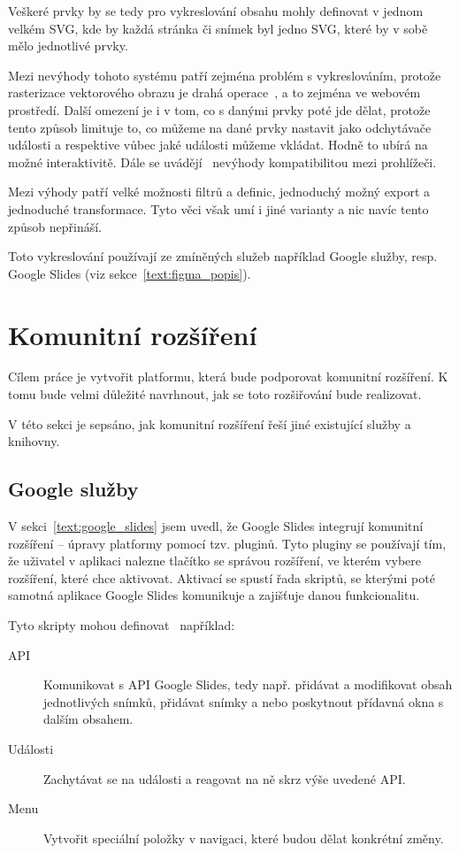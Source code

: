 Veškeré prvky by se tedy pro vykreslování obsahu mohly definovat v jednom velkém SVG, kde by každá stránka či snímek byl jedno SVG, které by v sobě mělo jednotlivé prvky.

Mezi nevýhody tohoto systému patří zejména problém s vykreslováním, protože rasterizace vektorového obrazu je drahá operace~\cite{svg_css_html}, a to zejména ve webovém prostředí.
Další omezení je i v tom, co s danými prvky poté jde dělat, protože tento způsob limituje to, co můžeme na dané prvky nastavit jako odchytávače události a respektive vůbec jaké události můžeme vkládat.
Hodně to ubírá na možné interaktivitě.
Dále se uvádějí~\cite{svg_css_html} nevýhody kompatibilitou mezi prohlížeči.

Mezi výhody patří velké možnosti filtrů a definic, jednoduchý možný export a jednoduché transformace.
Tyto věci však umí i jiné varianty a nic navíc tento způsob nepřináší.

Toto vykreslování používají ze zmíněných služeb například Google služby, resp. Google Slides (viz sekce~\ref{text:figma_popis}).

\section{Komunitní rozšíření}\label{text:community_plugins}

Cílem práce je vytvořit platformu, která bude podporovat komunitní rozšíření.
K tomu bude velmi důležité navrhnout, jak se toto rozšiřování bude realizovat.

V této sekci je sepsáno, jak komunitní rozšíření řeší jiné existující služby a knihovny.

\subsection{Google služby}

V sekci~\ref{text:google_slides} jsem uvedl, že Google Slides integrují komunitní rozšíření -- úpravy platformy pomocí tzv. pluginů.
Tyto pluginy se používají tím, že uživatel v aplikaci nalezne tlačítko se správou rozšíření, ve kterém vybere rozšíření, které chce aktivovat.
Aktivací se spustí řada skriptů, se kterými poté samotná aplikace Google Slides komunikuje a zajišťuje danou funkcionalitu.

Tyto skripty mohou definovat~\cite{google_apps} například:

\begin{description}
    \item[API] Komunikovat s API Google Slides, tedy např. přidávat a modifikovat obsah jednotlivých snímků, přidávat snímky a nebo poskytnout přídavná okna s dalším obsahem.
    \item[Události] Zachytávat se na události a reagovat na ně skrz výše uvedené API.
    \item[Menu] Vytvořit speciální položky v navigaci, které budou dělat konkrétní změny.
\end{description}

